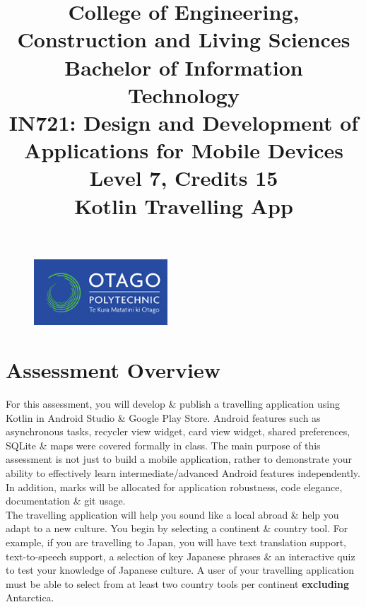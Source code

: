 \documentclass{article}
\author{}
\begin{document}
\begin{figure}
    \centering
    \includegraphics[width=50mm]{./img/logo.png}
\end{figure}

\title{College of Engineering, Construction and Living Sciences\\Bachelor of Information Technology\\IN721: Design and Development of Applications for Mobile Devices\\Level 7, Credits 15\\\textbf{Kotlin Travelling App}}
\date{}
\maketitle

\section*{Assessment Overview}
For this assessment, you will develop \& publish a travelling application using Kotlin in Android Studio \& Google Play Store. Android features such as asynchronous tasks, recycler view widget, card view widget, shared preferences, SQLite \& maps were covered formally in class. The main purpose of this assessment is not just to build a mobile application, rather to demonstrate your ability to effectively learn intermediate/advanced Android features independently. In addition, marks will be allocated for application robustness, code elegance, documentation \& git usage. \\ 

The travelling application will help you sound like a local abroad \& help you adapt to a new culture. You begin by selecting a continent \& country tool. For example, if you are travelling to Japan, you will have text translation support, text-to-speech support, a selection of key Japanese phrases \& an interactive quiz to test your knowledge of Japanese culture. A user of your travelling application must be able to select from at least two country tools per continent \textbf{excluding} Antarctica.
\end{document}
